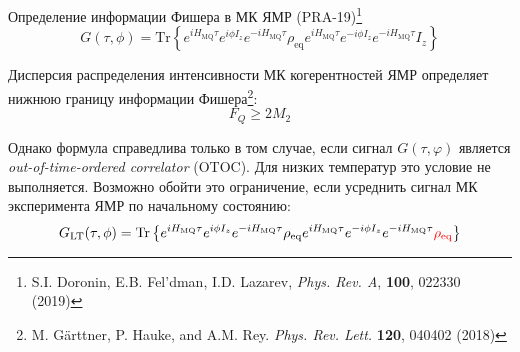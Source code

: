 \begin{frame}{Определение информации Фишера в МК ЯМР (PRA-19)\footnote{S.I. Doronin, E.B. Fel'dman,  I.D. Lazarev, \textit{Phys. Rev. A}, \textbf{100}, 022330 (2019)}}
  $$ G(\tau, \phi) =
     \mathrm{Tr}\left\{
         e^{iH_\mathrm{MQ}\tau} e^{i\phi I_z} e^{-iH_\mathrm{MQ}\tau}
         \rho_\mathrm{eq}
         e^{iH_\mathrm{MQ}\tau} e^{-i\phi I_z} e^{-iH_\mathrm{MQ}\tau}
         I_z \right\}
  $$
  \begin{alertblock}{}
      Дисперсия распределения интенсивности МК когерентностей ЯМР определяет нижнюю границу информации
      Фишера\footnote[frame]{
      M. G\"arttner, P. Hauke, and A.M. Rey. \textit{Phys. Rev. Lett.} \textbf{120}, 040402 (2018)}:
      $$
      F_Q \geq 2M_2
      $$
  \end{alertblock}
  Однако формула справедлива только в том случае,
  если сигнал $G(\tau, \varphi)$ является \textit{out-of-time-ordered correlator} (OTOC).
  Для низких температур это условие не выполняется.
  Возможно обойти это ограничение,
  если усреднить сигнал МК эксперимента ЯМР по начальному состоянию:
  $$ G_\mathrm{LT}(\tau, \phi)
     = \mathrm{Tr}\left\{
       e^{iH_\mathrm{MQ}\tau} e^{i\phi I_z} e^{-iH_\mathrm{MQ}\tau}
       \rho_\mathrm{eq}
       e^{iH_\mathrm{MQ}\tau} e^{-i\phi I_z} e^{-iH_\mathrm{MQ}\tau}
       {\color{red} \rho_\mathrm{eq}}
    \right\}
  $$
\end{frame}


